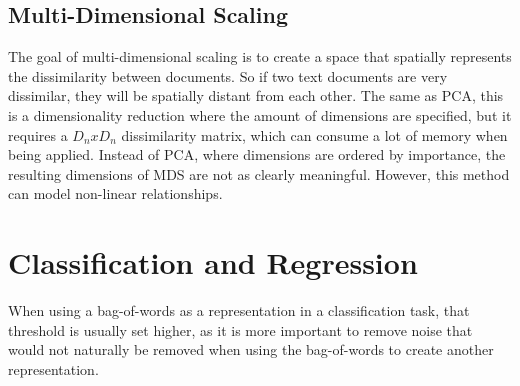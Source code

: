 



\subsection{Multi-Dimensional Scaling}

The goal of multi-dimensional scaling is to create a space that spatially represents the dissimilarity between documents. So if two text documents are very dissimilar, they will be spatially distant from each other. The same as PCA, this is a dimensionality reduction where the amount of dimensions are specified, but it requires a $D_n x D_n$ dissimilarity matrix, which can consume a lot of memory when being applied. Instead of PCA, where dimensions are ordered by importance, the resulting dimensions of MDS are not as clearly meaningful. However, this method can model non-linear relationships.

\section{Classification and Regression}\label{ch2:ml}

When using a bag-of-words as a representation in a classification task, that threshold is usually set higher, as it is more important to remove noise that would not naturally be removed when using the bag-of-words to create another representation. 


